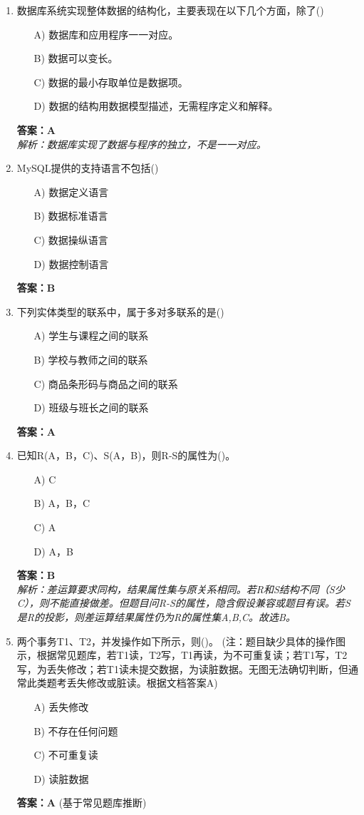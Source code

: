 \documentclass[a4paper,12pt]{article}
\begin{document}
\begin{enumerate}[label=\arabic*.]
\item 数据库系统实现整体数据的结构化，主要表现在以下几个方面，除了()
\begin{itemize}
    \item[A)] 数据库和应用程序一一对应。
    \item[B)] 数据可以变长。
    \item[C)] 数据的最小存取单位是数据项。
    \item[D)] 数据的结构用数据模型描述，无需程序定义和解释。
\end{itemize}
\textbf{答案：A} \\
\textit{解析：数据库实现了数据与程序的独立，不是一一对应。}

\item MySQL提供的支持语言不包括()
\begin{itemize}
    \item[A)] 数据定义语言
    \item[B)] 数据标准语言
    \item[C)] 数据操纵语言
    \item[D)] 数据控制语言
\end{itemize}
\textbf{答案：B}

\item 下列实体类型的联系中，属于多对多联系的是()
\begin{itemize}
    \item[A)] 学生与课程之间的联系
    \item[B)] 学校与教师之间的联系
    \item[C)] 商品条形码与商品之间的联系
    \item[D)] 班级与班长之间的联系
\end{itemize}
\textbf{答案：A}

\item 已知R(A，B，C)、S(A，B)，则R-S的属性为()。
\begin{itemize}
    \item[A)] C
    \item[B)] A，B，C
    \item[C)] A
    \item[D)] A，B
\end{itemize}
\textbf{答案：B} \\
\textit{解析：差运算要求同构，结果属性集与原关系相同。若R和S结构不同（S少C），则不能直接做差。但题目问R-S的属性，隐含假设兼容或题目有误。若S是R的投影，则差运算结果属性仍为R的属性集A,B,C。故选B。}

\item 两个事务T1、T2，并发操作如下所示，则()。 (注：题目缺少具体的操作图示，根据常见题库，若T1读，T2写，T1再读，为不可重复读；若T1写，T2写，为丢失修改；若T1读未提交数据，为读脏数据。无图无法确切判断，但通常此类题考丢失修改或脏读。根据文档答案A)
\begin{itemize}
    \item[A)] 丢失修改
    \item[B)] 不存在任何问题
    \item[C)] 不可重复读
    \item[D)] 读脏数据
\end{itemize}
\textbf{答案：A} (基于常见题库推断)


\end{enumerate}
\end{document}

